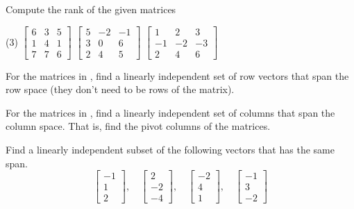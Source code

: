 \begin{exercise} \label{exercise:rankmatrix}
Compute the rank of the given matrices
\begin{tasks}(3)
\task
$\begin{bmatrix}
6 & 3 & 5 \\
1 & 4 & 1 \\
7 & 7 & 6
\end{bmatrix}$
\task
$\begin{bmatrix}
5 & -2 & -1 \\
3 & 0 & 6 \\
2 & 4 & 5
\end{bmatrix}$
\task
$\begin{bmatrix}
1 & 2 & 3 \\
-1 & -2 & -3 \\
2 & 4 & 6
\end{bmatrix}$
\end{tasks}
\end{exercise}

\begin{exercise}
For the matrices in , find
a linearly independent set of row vectors that span the row space
(they don't need to be rows of the matrix).
\end{exercise}

\begin{exercise}
For the matrices in , find
a linearly independent set of columns that span the column space.
That is, find the pivot columns of the matrices.
\end{exercise}

\begin{exercise}
Find a linearly independent subset of the following vectors that has
the same span.
\begin{equation*}
\begin{bmatrix}
-1 \\ 1 \\ 2
\end{bmatrix}
, \quad
\begin{bmatrix}
2 \\ -2 \\ -4
\end{bmatrix}
, \quad
\begin{bmatrix}
-2 \\ 4 \\ 1
\end{bmatrix}
, \quad
\begin{bmatrix}
-1 \\ 3 \\ -2
\end{bmatrix}
\end{equation*}
\end{exercise}

